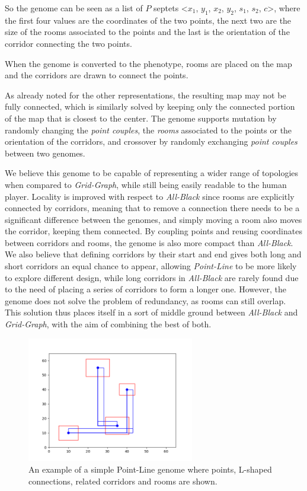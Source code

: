 \documentclass{Configuration_Files/PoliMi3i_thesis}
\begin{document}
So the genome can be seen as a list of $P$ septets <$x_1$, $y_1$, $x_2$, $y_2$, $s_1$, $s_2$, $c$>, where the first four values are the coordinates of the two points, the next two are the size of the rooms associated to the points and the last is the orientation of the corridor connecting the two points. 

When the genome is converted to the phenotype, rooms are placed on the map and the corridors are drawn to connect the points. 

As already noted for the other representations, the resulting map may not be fully connected, which is similarly solved by keeping only the connected portion of the map that is closest to the center. The genome supports mutation by randomly changing the \textit{point couples}, the \textit{rooms} associated to the points or the orientation of the corridors, and crossover by randomly exchanging \textit{point couples} between two genomes.

We believe this genome to be capable of representing a wider range of topologies when compared to \textit{Grid-Graph}, while still being easily readable to the human player. Locality is improved with respect to \textit{All-Black} since rooms are explicitly connected by corridors, meaning that to remove a connection there needs to be a significant difference between the genomes, and simply moving a room also moves the corridor, keeping them connected. By coupling points and reusing coordinates between corridors and rooms, the genome is also more compact than \textit{All-Black}. We also believe that defining corridors by their start and end gives both long and short corridors an equal chance to appear, allowing \textit{Point-Line} to be more likely to explore different design, while long corridors in \textit{All-Black} are rarely found due to the need of placing a series of corridors to form a longer one.  However, the genome does not solve the problem of redundancy, as rooms can still overlap. This solution thus places itself in a sort of middle ground between \textit{All-Black} and \textit{Grid-Graph}, with the aim of combining the best of both.

\begin{figure}[H]
    \centering
    \includegraphics[width=0.65\textwidth]{images/PointGenome.png}
    \caption[Point-Line example]{An example of a simple Point-Line genome where points, L-shaped connections, related corridors and rooms are shown.}
    \label{fig:point_line}
\end{figure}
\end{document}
